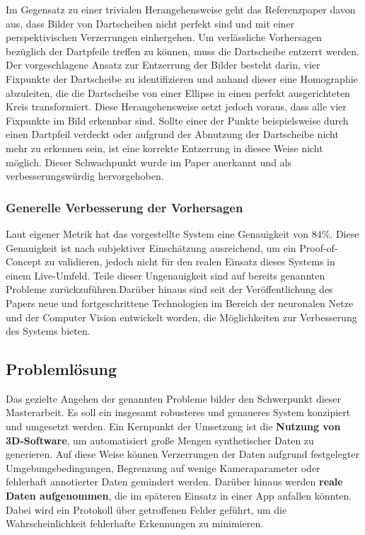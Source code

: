 Im Gegensatz zu einer trivialen Herangehensweise geht das Referenzpaper davon aus, dass Bilder von Dartscheiben nicht perfekt sind und mit einer perspektivischen Verzerrungen einhergehen. Um verlässliche Vorhersagen bezüglich der Dartpfeile treffen zu können, muss die Dartscheibe entzerrt werden. Der vorgeschlagene Ansatz zur Entzerrung der Bilder besteht darin, vier Fixpunkte der Dartscheibe zu identifizieren und anhand dieser eine Homographie abzuleiten, die die Dartscheibe von einer Ellipse in einen perfekt ausgerichteten Kreis transformiert. Diese Herangehensweise setzt jedoch voraus, dass alle vier Fixpunkte im Bild erkennbar sind. Sollte einer der Punkte beispielsweise durch einen Dartpfeil verdeckt oder aufgrund der Abnutzung der Dartscheibe nicht mehr zu erkennen sein, ist eine korrekte Entzerrung in diesee Weise nicht möglich. Dieser Schwachpunkt wurde im Paper anerkannt und als verbesserungswürdig hervorgehoben.

\subsubsection{Generelle Verbesserung der Vorhersagen}
\label{sec:ziele:schwachstellen:verbesserung}

Laut eigener Metrik hat das vorgestellte System eine Genauigkeit von 84\%. Diese Genauigkeit ist nach subjektiver Einschätzung ausreichend, um ein Proof-of-Concept zu validieren, jedoch nicht für den realen Einsatz dieses Systems in einem Live-Umfeld. Teile dieser Ungenauigkeit sind auf bereits genannten Probleme zurückzuführen.Darüber hinaus sind seit der Veröffentlichung des Papers neue und fortgeschrittene Technologien im Bereich der neuronalen Netze und der Computer Vision entwickelt worden, die Möglichkeiten zur Verbesserung des Systems bieten.


\subsection{Problemlösung}
\label{sec:ziele:problemlösung}

Das gezielte Angehen der genannten Probleme bilder den Schwerpunkt dieser Masterarbeit. Es soll ein insgesamt robusteres und genaueres System konzipiert und umgesetzt werden. Ein Kernpunkt der Umsetzung ist die \textbf{Nutzung von 3D-Software}, um automatisiert große Mengen synthetischer Daten zu generieren. Auf diese Weise können Verzerrungen der Daten aufgrund festgelegter Umgebungsbedingungen, Begrenzung auf wenige Kameraparameter oder fehlerhaft annotierter Daten gemindert werden. Darüber hinaus werden \textbf{reale Daten aufgenommen}, die im späteren Einsatz in einer App anfallen könnten. Dabei wird ein Protokoll über getroffenen Felder geführt, um die Wahrscheinlichkeit fehlerhafte Erkennungen zu minimieren.

